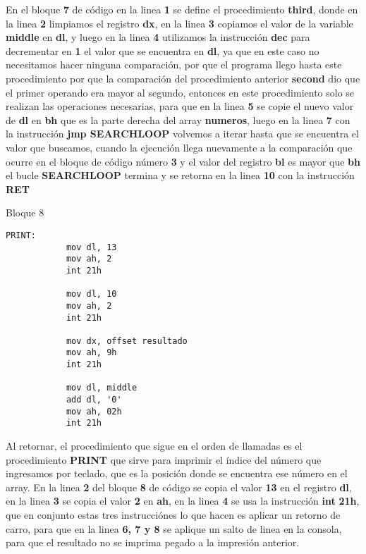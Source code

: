 \documentclass[a4paper,twoside]{article}
\newcommand{\codebordo}[1]{\textcolor{codebordo}{#1}}
\newcommand{\codeblue}[1]{\textcolor{codeblue}{#1}}
\begin{document}
  {\Large En el bloque \textbf{7} de código en la linea \textbf{1} se define el procedimiento \codeblue{\textbf{third}},
    donde en la linea \textbf{2} limpiamos el registro \codebordo{\textbf{dx}}, en la linea \textbf{3}
    copiamos el valor de la variable \textbf{middle} en \codebordo{\textbf{dl}}, y luego en la linea \textbf{4} 
    utilizamos la instrucción \codeblue{\textbf{dec}} para decrementar en \textbf{1} el valor que se encuentra en 
    \codebordo{\textbf{dl}}, ya que en este caso no necesitamos hacer ninguna comparación, por que el programa llego 
    hasta este procedimiento por que la comparación del procedimiento anterior \codeblue{\textbf{second}} dio que el primer
    operando era mayor al segundo, entonces en este procedimiento solo se realizan las operaciones necesarias, para que en 
    la linea \textbf{5} se copie el nuevo valor de \codebordo{\textbf{dl}} en \codebordo{\textbf{bh}} que es la parte 
    derecha del array \textbf{numeros}, luego en la linea \textbf{7} con la instrucción \codeblue{\textbf{jmp SEARCHLOOP}}
    volvemos a iterar hasta que se encuentra el valor que buscamos, cuando la ejecución llega nuevamente a la comparación 
    que ocurre en el bloque de código número \textbf{3} y el valor del registro \codebordo{\textbf{bl}} es mayor que 
    \codebordo{\textbf{bh}} el bucle \codeblue{\textbf{SEARCHLOOP}} termina y se retorna en la linea \textbf{10} con la 
    instrucción \codeblue{\textbf{RET}}
  }

\begin{center}
    {\normalsize Bloque 8}
    \begin{lstlisting}[language=8086] 
        PRINT:
            mov dl, 13
            mov ah, 2
            int 21h
            
            mov dl, 10
            mov ah, 2
            int 21h
            
            mov dx, offset resultado
            mov ah, 9h
            int 21h
             
            mov dl, middle
            add dl, '0'
            mov ah, 02h
            int 21h
    \end{lstlisting}
\end{center}
\newpage
\vspace*{-2cm}

{\Large Al retornar, el procedimiento que sigue en el orden de llamadas es el procedimiento \codeblue{\textbf{PRINT}} que sirve para imprimir 
  el índice del número que ingresamos por teclado, que es la posición donde se encuentra ese número en el array.
  En la linea \textbf{2} del bloque \textbf{8} de código se copia el valor \textbf{13} en el registro \codebordo{\textbf{dl}}, en la linea \textbf{3} se 
  copia el valor \textbf{2} en \codebordo{\textbf{ah}}, en la linea \textbf{4} se usa la instrucción \codeblue{\textbf{int}} \textbf{21h}, que en conjunto
  estas tres instrucciónes lo que hacen es aplicar un retorno de carro, para que en la linea \textbf{6, 7 y 8} se aplique un salto de linea en la consola, 
  para que el resultado no se imprima pegado a la impresión anterior. 
 }
\end{document}
